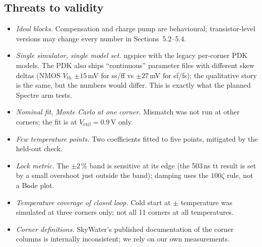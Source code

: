 \documentclass[11pt,a4paper]{article}
\newcommand{\vc}{V_{\mathrm{ctrl}}}
\begin{document}
\subsection{Threats to validity}
\begin{itemize}[nosep]
\item \emph{Ideal blocks.} Compensation and charge pump are behavioural; transistor-level versions may change every number in Sections~5.2--5.4.
\item \emph{Single simulator, single model set.} ngspice with the legacy per-corner PDK models. The PDK also ships ``continuous'' parameter files with different skew deltas (NMOS $V_{th}$ $\pm15$\,mV for ss/ff vs $\pm27$\,mV for sf/fs); the qualitative story is the same, but the numbers would differ. This is exactly what the planned Spectre arm tests.
\item \emph{Nominal fit, Monte Carlo at one corner.} Mismatch was not run at other corners; the fit is at $\vc=0.9$\,V only.
\item \emph{Few temperature points.} Two coefficients fitted to five points, mitigated by the held-out check.
\item \emph{Lock metric.} The $\pm2\,\%$ band is sensitive at its edge (the 503\,ns tt result is set by a small overshoot just outside the band); damping uses the $100\zeta$ rule, not a Bode plot.
\item \emph{Temperature coverage of closed loop.} Cold start at $\pm$ temperature was simulated at three corners only; not all 11 corners at all temperatures.
\item \emph{Corner definitions.} SkyWater's published documentation of the corner columns is internally inconsistent; we rely on our own measurements.
\end{itemize}

\end{document}
